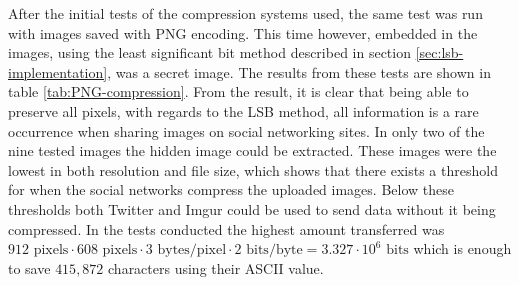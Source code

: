 After the initial tests of the compression systems used, the same test was run with images saved with PNG encoding.
This time however, embedded in the images, using the least significant bit method described in section \ref{sec:lsb-implementation}, was a secret image. 
The results from these tests are shown in table \ref{tab:PNG-compression}.
From the result, it is clear that being able to preserve all pixels, with regards to the LSB method, all information is a rare occurrence when sharing images on social networking sites. In only two of the nine tested images the hidden image could be extracted. 
These images were the lowest in both resolution and file size, which shows that there exists a threshold for when the social networks compress the uploaded images. 
Below these thresholds both Twitter and Imgur could be used to send data without it being compressed. In the tests conducted the highest amount transferred was $912\text{ pixels} \cdot 608\text{ pixels} \cdot 3\text{ bytes/pixel} \cdot 2\text{ bits/byte} = 3.327\cdot 10^6\text{ bits}$ which is enough to save $415,872$ characters using their ASCII value.\\ 


